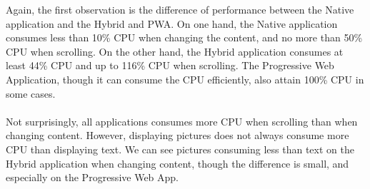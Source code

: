 \documentclass{kththesis}
\begin{document}
\begin{table}[h]
    \centering
    
    \caption{Average CPU usage (\% CPU core)}
    \label{tab:cpu}
\end{table}

Again, the first observation is the difference of performance between the Native application and the Hybrid and PWA. On one hand, the Native application consumes less than 10\% CPU when changing the content, and no more than 50\% CPU when scrolling. On the other hand, the Hybrid application consumes at least 44\% CPU and up to 116\% CPU when scrolling. The Progressive Web Application, though it can consume the CPU efficiently, also attain 100\% CPU in some cases.

\paragraph{}
Not surprisingly, all applications consumes more CPU when scrolling than when changing content. However, displaying pictures does not always consume more CPU than displaying text. We can see pictures consuming less than text on the Hybrid application when changing content, though the difference is small, and especially on the Progressive Web App. 
\end{document}
